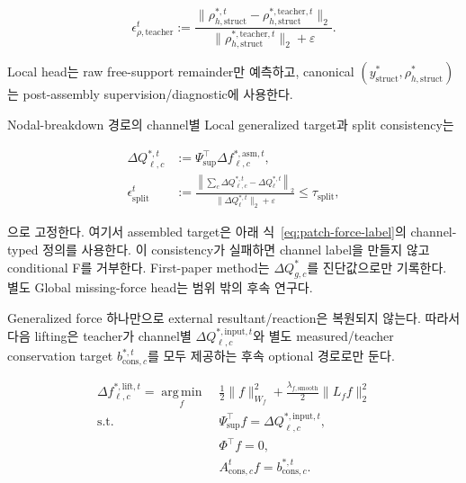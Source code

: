 \documentclass[11pt,a4paper]{article}
\newcommand{\eps}{\varepsilon}
\newcommand{\argmin}{\operatorname*{arg\,min}}
\begin{document}
\begin{equation}
  \epsilon_{\rho,\mathrm{teacher}}^t
  :=
  \frac{
    \|\rho_{h,\mathrm{struct}}^{*,t}
    -\rho_{h,\mathrm{struct}}^{*,\mathrm{teacher},t}\|_2
  }{
    \|\rho_{h,\mathrm{struct}}^{*,\mathrm{teacher},t}\|_2+\eps
  }.
  \label{eq:teacher-reaction-projection-diagnostic}
\end{equation}

Local head는 raw free-support remainder만 예측하고, canonical
\((y_{\mathrm{struct}}^*,\rho_{h,\mathrm{struct}}^*)\)는 post-assembly
supervision/diagnostic에 사용한다.

Nodal-breakdown 경로의 channel별 Local generalized target과 split consistency는

\begin{equation}
\begin{aligned}
  \Delta Q_{\ell,c}^{*,t}
  &:={}\Psi_{\mathrm{sup}}^\top
  \Delta f_{\ell,c}^{*,\mathrm{asm},t},\\
  \epsilon_{\mathrm{split}}^t
  &:={}
  \frac{\left\|\sum_c\Delta Q_{\ell,c}^{*,t}-\Delta Q_\ell^{*,t}\right\|_2}
  {\|\Delta Q_\ell^{*,t}\|_2+\eps}
  \le\tau_{\mathrm{split}},
  \label{eq:channel-generalized-force-split}
\end{aligned}
\end{equation}

으로 고정한다. 여기서 assembled target은 아래 식~\eqref{eq:patch-force-label}의
channel-typed 정의를 사용한다. 이 consistency가 실패하면 channel label을 만들지 않고
conditional F를 거부한다.
First-paper method는 \(\Delta Q_{g,c}^{*}\)를 진단값으로만 기록한다.
별도 Global missing-force head는 범위 밖의 후속 연구다.

Generalized force 하나만으로 external resultant/reaction은 복원되지 않는다.
따라서 다음 lifting은 teacher가 channel별
\(\Delta Q_{\ell,c}^{*,\mathrm{input},t}\)와 별도 measured/teacher conservation target
\(b_{\mathrm{cons},c}^{*,t}\)를 모두 제공하는 후속 optional 경로로만 둔다.

\begin{equation}
\begin{aligned}
  \Delta f_{\ell,c}^{*,\mathrm{lift},t}
  =\argmin_f\;&
  \frac12\|f\|_{W_f}^2
  +\frac{\lambda_{f,\mathrm{smooth}}}{2}\|L_ff\|_2^2\\
  \mathrm{s.t.}\;&
  \Psi_{\mathrm{sup}}^\top f=\Delta Q_{\ell,c}^{*,\mathrm{input},t},\\
  &\Phi^\top f=0,\\
  &A_{\mathrm{cons},c}^tf=b_{\mathrm{cons},c}^{*,t}.
  \label{eq:generalized-force-lifting}
\end{aligned}
\end{equation}
\end{document}
